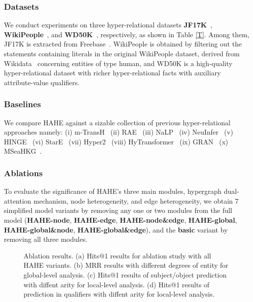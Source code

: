 \documentclass[11pt]{article}
\begin{document}
\subsubsection{Datasets} We conduct experiments on three hyper-relational datasets \textbf{JF17K}~\citep{m-TransH}, \textbf{WikiPeople}~\citep{NaLP}, and \textbf{WD50K}~\citep{StarE}, respectively, as shown in Table \ref{T}. Among them, JF17K is extracted from Freebase~\citep{Freebase}. WikiPeople is obtained by filtering out the statements containing literals in the original WikiPeople dataset, derived from Wikidata~\citep{Wikidata} concerning entities of type human, and WD50K is a high-quality hyper-relational dataset with richer hyper-relational facts with auxiliary attribute-value qualifiers. 

\subsubsection{Baselines} We compare HAHE against a sizable collection of previous hyper-relational approaches namely: (i) m-TransH~\citep{m-TransH} (ii) RAE~\citep{RAE} (iii) NaLP~\citep{NaLP} (iv) NeuInfer~\citep{NeuInfer} (v) HINGE~\citep{HINGE} (vi) StarE~\citep{StarE} (vii) Hyper2~\citep{Hyper2} (viii) HyTransformer~\citep{HyTransformer} (ix) GRAN~\citep{GRAN} (x) MSeaHKG~\citep{MSeaHKG}.

\subsubsection{Ablations} To evaluate the significance of HAHE's three main modules, hypergraph dual-attention mechanism, node heterogeneity, and edge heterogeneity, we obtain 7 simplified model variants by removing any one or two modules from the full model (\textbf{HAHE-node}, \textbf{HAHE-edge}, \textbf{HAHE-node\&edge}, \textbf{HAHE-global}, \textbf{HAHE-global\&node}, \textbf{HAHE-global\&edge}), and the \textbf{basic} variant by removing all three modules.

\begin{figure*}[h!t]
    \centering
	\caption{Ablation results. (a) Hits@1 results for ablation study with all HAHE variants. (b) MRR results with different degrees of entity for global-level analysis. (c) Hits@1 results of subject/object prediction with diffent arity for local-level analysis. (d) Hits@1 results of prediction in qualifiers with diffent arity for local-level analysis.}
	\label{f3}
\end{figure*}
\end{document}

